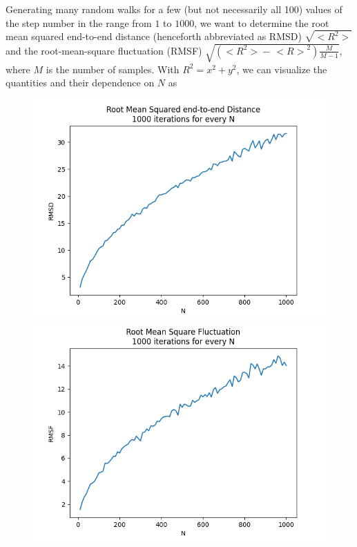 \documentclass[a4paper,12pt]{article}
\begin{document}
Generating many random walks for a few (but not necessarily all 100) values of the step number in the range from
$1$ to $1000$, we want to determine the root mean squared end-to-end distance (henceforth abbreviated as RMSD)
$\sqrt{<\!R^{2}\!>}$ and the root-mean-square fluctuation (RMSF) $\sqrt{(<\!R^2\!>\!-\, {<\!R\!>}^2) \frac{M}{M - 1}}$,
where $M$ is the number of samples. With $R^2 = x^2 + y^2$, we can visualize the quantities and their dependence
on $N$ as

\begin{figure}[!ht]
  \centering
  \begin{minipage}{0.48\textwidth}
    \includegraphics[width=\textwidth]{img/2_1c_rmsd_1000.png}
  \end{minipage}
  \begin{minipage}{0.48\textwidth}
    \includegraphics[width=\textwidth]{img/2_1c_rmsf_1000.png}
  \end{minipage}
\end{figure}
\end{document}
